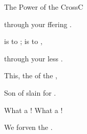 \documentclass[12pt]{book}
\begin{document}
\begin{song}{The Power of the Cross}{C}
\begin{SBExtraKeys}
{\begin{SBVerse}
         through your ffering 
              .

         is  to ;
             is  to ,

         through your less .

    \end{SBVerse}

    \begin{SBChorus}

        This, the  of the ,

        Son of  slain for .

        What a ! What a !

        We  forven  the . 
            \Ch{[Em}{}  \Ch{C]}{}

    \end{SBChorus}
}\end{SBExtraKeys}
\end{song}
\end{document}
